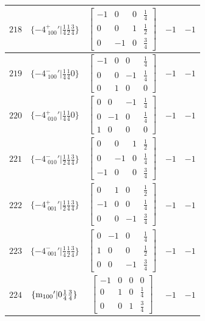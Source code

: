 \documentclass[fleqn,8pt]{jsarticle}
\begin{document}
\begin{longtable}{ccccc}
$ 218 $ & $ \{-4^{+}_{\,\,100}{}'|\frac{1}{4} \frac{1}{2} \frac{3}{4}\} $ & $ \begin{bmatrix} -1 & 0 & 0 & \frac{1}{4} \\ 0 & 0 & 1 & \frac{1}{2} \\ 0 & -1 & 0 & \frac{3}{4} \end{bmatrix} $ & $ -1 $ & $ -1 $ \\ \hline
$ 219 $ & $ \{-4^{-}_{\,\,100}{}'|\frac{1}{4} \frac{1}{4} 0\} $ & $ \begin{bmatrix} -1 & 0 & 0 & \frac{1}{4} \\ 0 & 0 & -1 & \frac{1}{4} \\ 0 & 1 & 0 & 0 \end{bmatrix} $ & $ -1 $ & $ -1 $ \\ \hline
$ 220 $ & $ \{-4^{+}_{\,\,010}{}'|\frac{1}{4} \frac{1}{4} 0\} $ & $ \begin{bmatrix} 0 & 0 & -1 & \frac{1}{4} \\ 0 & -1 & 0 & \frac{1}{4} \\ 1 & 0 & 0 & 0 \end{bmatrix} $ & $ -1 $ & $ -1 $ \\ \hline
$ 221 $ & $ \{-4^{-}_{\,\,010}{}'|\frac{1}{2} \frac{1}{4} \frac{3}{4}\} $ & $ \begin{bmatrix} 0 & 0 & 1 & \frac{1}{2} \\ 0 & -1 & 0 & \frac{1}{4} \\ -1 & 0 & 0 & \frac{3}{4} \end{bmatrix} $ & $ -1 $ & $ -1 $ \\ \hline
$ 222 $ & $ \{-4^{+}_{\,\,001}{}'|\frac{1}{2} \frac{1}{4} \frac{3}{4}\} $ & $ \begin{bmatrix} 0 & 1 & 0 & \frac{1}{2} \\ -1 & 0 & 0 & \frac{1}{4} \\ 0 & 0 & -1 & \frac{3}{4} \end{bmatrix} $ & $ -1 $ & $ -1 $ \\ \hline
$ 223 $ & $ \{-4^{-}_{\,\,001}{}'|\frac{1}{4} \frac{1}{2} \frac{3}{4}\} $ & $ \begin{bmatrix} 0 & -1 & 0 & \frac{1}{4} \\ 1 & 0 & 0 & \frac{1}{2} \\ 0 & 0 & -1 & \frac{3}{4} \end{bmatrix} $ & $ -1 $ & $ -1 $ \\ \hline
$ 224 $ & $ \{{\rm m}_{100}{}'|0 \frac{1}{4} \frac{3}{4}\} $ & $ \begin{bmatrix} -1 & 0 & 0 & 0 \\ 0 & 1 & 0 & \frac{1}{4} \\ 0 & 0 & 1 & \frac{3}{4} \end{bmatrix} $ & $ -1 $ & $ -1 $ \\ \hline

\end{longtable}
\end{document}

